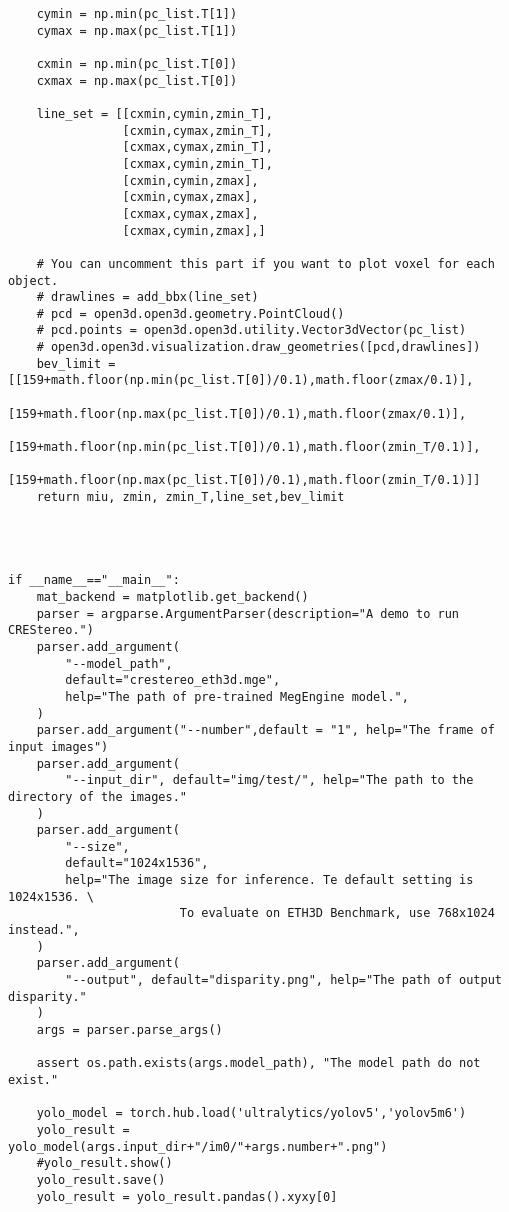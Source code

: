 \begin{lstlisting}
    cymin = np.min(pc_list.T[1])
    cymax = np.max(pc_list.T[1])

    cxmin = np.min(pc_list.T[0])
    cxmax = np.max(pc_list.T[0])

    line_set = [[cxmin,cymin,zmin_T],
                [cxmin,cymax,zmin_T],
                [cxmax,cymax,zmin_T],
                [cxmax,cymin,zmin_T],
                [cxmin,cymin,zmax],
                [cxmin,cymax,zmax],
                [cxmax,cymax,zmax],
                [cxmax,cymin,zmax],]

    # You can uncomment this part if you want to plot voxel for each object.
    # drawlines = add_bbx(line_set)
    # pcd = open3d.open3d.geometry.PointCloud()
    # pcd.points = open3d.open3d.utility.Vector3dVector(pc_list)
    # open3d.open3d.visualization.draw_geometries([pcd,drawlines])
    bev_limit = [[159+math.floor(np.min(pc_list.T[0])/0.1),math.floor(zmax/0.1)],
                 [159+math.floor(np.max(pc_list.T[0])/0.1),math.floor(zmax/0.1)],
                 [159+math.floor(np.min(pc_list.T[0])/0.1),math.floor(zmin_T/0.1)],
                 [159+math.floor(np.max(pc_list.T[0])/0.1),math.floor(zmin_T/0.1)]]
    return miu, zmin, zmin_T,line_set,bev_limit




if __name__=="__main__":
    mat_backend = matplotlib.get_backend()
    parser = argparse.ArgumentParser(description="A demo to run CREStereo.")
    parser.add_argument(
        "--model_path",
        default="crestereo_eth3d.mge",
        help="The path of pre-trained MegEngine model.",
    )
    parser.add_argument("--number",default = "1", help="The frame of input images")
    parser.add_argument(
        "--input_dir", default="img/test/", help="The path to the directory of the images."
    )
    parser.add_argument(
        "--size",
        default="1024x1536",
        help="The image size for inference. Te default setting is 1024x1536. \
                        To evaluate on ETH3D Benchmark, use 768x1024 instead.",
    )
    parser.add_argument(
        "--output", default="disparity.png", help="The path of output disparity."
    )
    args = parser.parse_args()

    assert os.path.exists(args.model_path), "The model path do not exist."

    yolo_model = torch.hub.load('ultralytics/yolov5','yolov5m6')
    yolo_result = yolo_model(args.input_dir+"/im0/"+args.number+".png")
    #yolo_result.show()
    yolo_result.save()
    yolo_result = yolo_result.pandas().xyxy[0]
    

\end{lstlisting}
